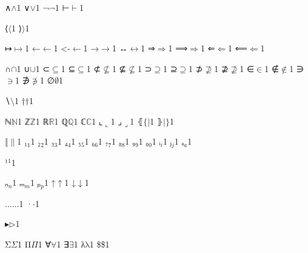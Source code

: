 {	{∧}{{\ensuremath{\wedge}}}1
	{∨}{{\ensuremath{\vee}}}1
	{¬}{{\ensuremath{\neg}}}1
	{⊢}{{\ensuremath{\vdash}}}1
	
	{⟨}{{\ensuremath{\langle}}}1
	{⟩}{{\ensuremath{\rangle}}}1
	
	{↦}{{\ensuremath{\mapsto}}}1
	{←}{{\ensuremath{\leftarrow}}}1
	{<-}{{\ensuremath{\leftarrow}}}1
	{→}{{\ensuremath{\rightarrow}}}1
	{↔}{{\ensuremath{\leftrightarrow}}}1
	{⇒}{{\ensuremath{\Rightarrow}}}1
	{⟹}{{\ensuremath{\Longrightarrow}}}1
	{⇐}{{\ensuremath{\Leftarrow}}}1
	{⟸}{{\ensuremath{\Longleftarrow}}}1
	
	{∩}{{\ensuremath{\cap}}}1
	{∪}{{\ensuremath{\cup}}}1
	{⊂}{{\ensuremath{\subseteq}}}1
	{⊆}{{\ensuremath{\subseteq}}}1
	{⊄}{{\ensuremath{\nsubseteq}}}1
	{⊈}{{\ensuremath{\nsubseteq}}}1
	{⊃}{{\ensuremath{\supseteq}}}1
	{⊇}{{\ensuremath{\supseteq}}}1
	{⊅}{{\ensuremath{\nsupseteq}}}1
	{⊉}{{\ensuremath{\nsupseteq}}}1
	{∈}{{\ensuremath{\in}}}1
	{∉}{{\ensuremath{\notin}}}1
	{∋}{{\ensuremath{\ni}}}1
	{∌}{{\ensuremath{\notni}}}1
	{∅}{{\ensuremath{\emptyset}}}1
	
	{∖}{{\ensuremath{\setminus}}}1
	{†}{{\ensuremath{\dag}}}1
	
	{ℕ}{{\ensuremath{\mathbb{N}}}}1
	{ℤ}{{\ensuremath{\mathbb{Z}}}}1
	{ℝ}{{\ensuremath{\mathbb{R}}}}1
	{ℚ}{{\ensuremath{\mathbb{Q}}}}1
	{ℂ}{{\ensuremath{\mathbb{C}}}}1
	{⌞}{{\ensuremath{\llcorner}}}1
	{⌟}{{\ensuremath{\lrcorner}}}1
	{⦃}{{\ensuremath{\{\!|}}}1
	{⦄}{{\ensuremath{|\!\}}}}1
	
	{‖}{{\ensuremath{\|}}}1
	{₁}{{\ensuremath{_1}}}1
	{₂}{{\ensuremath{_2}}}1
	{₃}{{\ensuremath{_3}}}1
	{₄}{{\ensuremath{_4}}}1
	{₅}{{\ensuremath{_5}}}1
	{₆}{{\ensuremath{_6}}}1
	{₇}{{\ensuremath{_7}}}1
	{₈}{{\ensuremath{_8}}}1
	{₉}{{\ensuremath{_9}}}1
	{₀}{{\ensuremath{_0}}}1
	{ᵢ}{{\ensuremath{_i}}}1
	{ⱼ}{{\ensuremath{_j}}}1
	{ₐ}{{\ensuremath{_a}}}1
	
	{¹}{{\ensuremath{^1}}}1
	
	{ₙ}{{\ensuremath{_n}}}1
	{ₘ}{{\ensuremath{_m}}}1
	{ₚ}{{\ensuremath{_p}}}1
	{↑}{{\ensuremath{\uparrow}}}1
	{↓}{{\ensuremath{\downarrow}}}1
	
	{...}{{\ensuremath{\ldots}}}1
	{·}{{\ensuremath{\cdot}}}1
	
	{▸}{{\ensuremath{\triangleright}}}1
	
	{Σ}{{\color{symbolcolor}\ensuremath{\Sigma}}}1
	{Π}{{\color{symbolcolor}\ensuremath{\Pi}}}1
	{∀}{{\color{symbolcolor}\ensuremath{\forall}}}1
	{∃}{{\color{symbolcolor}\ensuremath{\exists}}}1
	{λ}{{\color{symbolcolor}\ensuremath{\mathrm{\lambda}}}}1
	{\$}{{\color{symbolcolor}\$}}1
	
}
